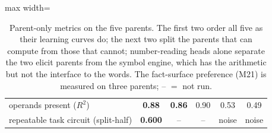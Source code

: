 \documentclass[11pt]{article}
\begin{document}
\begin{enumerate}[label=\textbf{M\arabic*}, leftmargin=*, itemsep=1.2em, resume]
\begin{table}[h]
\begin{adjustbox}{max width=\textwidth}
\begin{tabular}{lccccc}
operands present ($R^2$) & \textbf{0.88} & \textbf{0.86} & 0.90 & 0.53 & 0.49 \\
repeatable task circuit (split-half) & \textbf{0.600} & -- & -- & noise & noise \\
\bottomrule
\end{tabular}
\end{adjustbox}
\caption{Parent-only metrics on the five parents. The first two order all five as their
learning curves do; the next two split the parents that can compute from those that cannot;
number-reading heads alone separate the two elicit parents from the symbol engine, which has the
arithmetic but not the interface to the words. The fact-surface preference (M21) is measured on
three parents; -- $=$ not run.}
\label{tab:prefit}
\end{table}


\end{enumerate}
\end{document}

